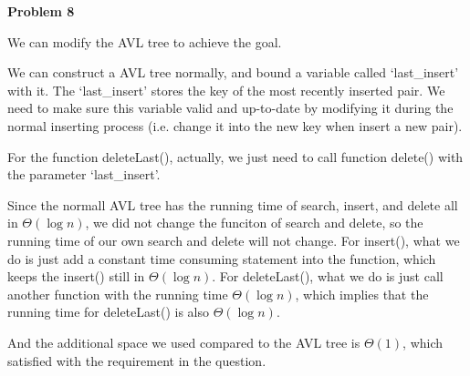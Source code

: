 \documentclass[12pt]{article}
\begin{document}
	
	\begin{center}
		{\Large\bf Problem 8}\\
		\vspace{3mm}
	\end{center}
	
	\def\question#1{\item[\bf #1.]}
	\def\part#1{\item[\bf #1)]}
	\newcommand{\pc}[1]{\mbox{\textbf{#1}}} %
	
	
	
	
	We can modify the AVL tree to achieve the goal.
	
	We can construct a AVL tree normally, and bound a variable called `last\_insert' with it. The `last\_insert' stores the key of the most recently inserted pair. We need to make sure this variable valid and up-to-date by modifying it during the normal inserting process (i.e. change it into the new key when insert a new pair).
	
	For the function deleteLast(), actually, we just need to call function delete() with the parameter `last\_insert'.
	
	Since the normall AVL tree has the running time of search, insert, and delete all in $\Theta(\log n)$, we did not change the funciton of search and delete, so the running time of our own search and delete will not change. For insert(), what we do is just add a constant time consuming statement into the function, which keeps the insert() still in $\Theta(\log n)$. For deleteLast(), what we do is just call another function with the running time $\Theta(\log n)$, which implies that the running time for deleteLast() is also $\Theta(\log n)$.
	
	And the additional space we used compared to the AVL tree is $\Theta(1)$, which satisfied with the requirement in the question.
	
\end{document}
